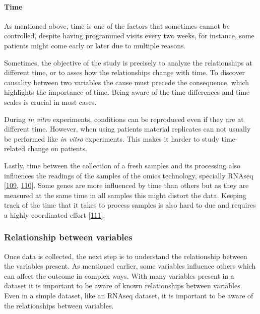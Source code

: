 \documentclass[
  12pt,
  a4paper,
  twoside,
  openright]{book}
\begin{document}
\hypertarget{time}{%
\paragraph*{Time}\label{time}}

As mentioned above, time is one of the factors that sometimes cannot be controlled, despite having programmed visits every two weeks, for instance, some patients might come early or later due to multiple reasons.

Sometimes, the objective of the study is precisely to analyze the relationships at different time, or to asses how the relationships change with time.
To discover causality between two variables the cause must precede the consequence, which highlights the importance of time.
Being aware of the time differences and time scales is crucial in most cases.

During \emph{in vitro} experiments, conditions can be reproduced even if they are at different time.
However, when using patients material replicates can not usually be performed like \emph{in vitro} experiments.
This makes it harder to study time-related change on patients.

Lastly, time between the collection of a fresh samples and its processing also influences the readings of the samples of the omics technology, specially RNAseq {[}\protect\hyperlink{ref-massoni-badosa2020}{109}, \protect\hyperlink{ref-zhu2017}{110}{]}.
Some genes are more influenced by time than others but as they are measured at the same time in all samples this might distort the data.
Keeping track of the time that it takes to process samples is also hard to due and requires a highly coordinated effort {[}\protect\hyperlink{ref-ferreira2018}{111}{]}.

\hypertarget{relationship-between-variables}{%
\subsubsection{Relationship between variables}\label{relationship-between-variables}}

Once data is collected, the next step is to understand the relationship between the variables present.
As mentioned earlier, some variables influence others which can affect the outcome in complex ways.
With many variables present in a dataset it is important to be aware of known relationships between variables.
Even in a simple dataset, like an RNAseq dataset, it is important to be aware of the relationships between variables.
\end{document}
